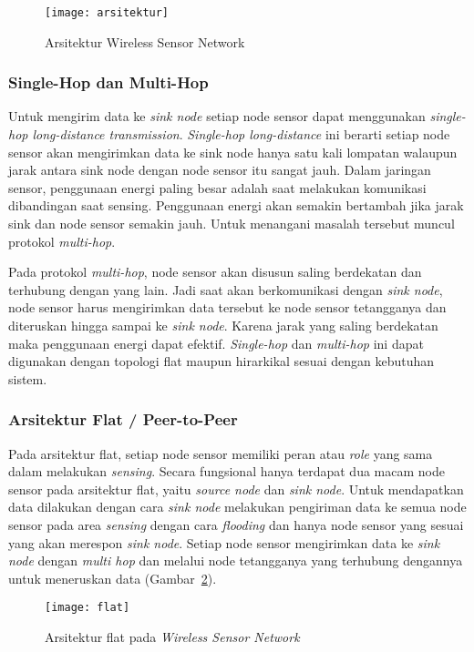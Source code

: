 \begin{figure} [H]
	\centering  
	\texttt{[image: arsitektur]}  
	\caption[Arsitektur Wireless Sensor Network]{Arsitektur Wireless Sensor Network} 
	\label{fig:arsitektur} 
\end{figure} 

\subsubsection{Single-Hop dan Multi-Hop}
Untuk mengirim data ke \textit{sink node} setiap node sensor dapat menggunakan \textit{single-hop long-distance transmission}. \textit{Single-hop long-distance} ini berarti setiap node sensor akan mengirimkan data ke sink node hanya satu kali lompatan walaupun jarak antara sink node dengan node sensor itu sangat jauh. Dalam jaringan sensor, penggunaan energi paling besar adalah saat melakukan komunikasi dibandingan saat sensing. Penggunaan energi akan semakin bertambah jika jarak sink dan node sensor semakin jauh. Untuk menangani masalah tersebut muncul protokol \textit{multi-hop}.

Pada protokol \textit{multi-hop}, node sensor akan disusun saling berdekatan dan terhubung dengan yang lain. Jadi saat akan berkomunikasi dengan \textit{sink node}, node sensor harus mengirimkan data tersebut ke node sensor tetangganya dan diteruskan hingga sampai ke \textit{sink node}. Karena jarak yang saling berdekatan maka penggunaan energi dapat efektif. \textit{Single-hop} dan \textit{multi-hop} ini dapat digunakan dengan topologi flat maupun hirarkikal sesuai dengan kebutuhan sistem.

\subsubsection{Arsitektur Flat / Peer-to-Peer}
Pada arsitektur flat, setiap node sensor memiliki peran atau \textit{role} yang sama dalam melakukan \textit{sensing}. Secara fungsional hanya terdapat dua macam node sensor pada arsitektur flat, yaitu \textit{source node} dan \textit{sink node}. Untuk mendapatkan data dilakukan dengan cara \textit{sink node} melakukan pengiriman data ke semua node sensor pada area \textit{sensing} dengan cara \textit{flooding} dan hanya node sensor yang sesuai yang akan merespon \textit{sink node}. Setiap node sensor mengirimkan data ke \textit{sink node} dengan \textit{multi hop} dan melalui node tetangganya yang terhubung dengannya untuk meneruskan data (Gambar~\ref{fig:flat}).
\begin{figure} [H]
	\centering  
	\texttt{[image: flat]}  
	\caption[Arsitektur flat pada \textit{Wireless Sensor Network}]{Arsitektur flat pada \textit{Wireless Sensor Network}} 
	\label{fig:flat} 
\end{figure} 

